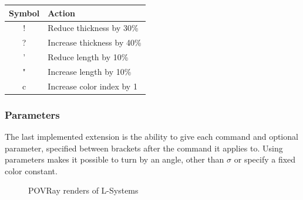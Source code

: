 \documentclass[11pt,a4paper]{article}
\begin{document}
\begin{center}
\begin{tabular}{c | l}
Symbol & Action \\ \hline
! & Reduce thickness by 30\% \\
? & Increase thickness by 40\% \\
' & Reduce length by 10\% \\
" & Increase length by 10\% \\
c & Increase color index by 1
\end{tabular}
\end{center}


\subsubsection{Parameters}
The last implemented extension is the ability to give each command and optional parameter, specified between brackets after the command it applies to. Using parameters makes it possible to turn by an angle, other than $\sigma$ or specify a fixed color constant.

\begin{figure}[h!]
  \centering
  \caption{POVRay renders of L-Systems}
  \label{fig:povrenders}
\end{figure}
\end{document}

